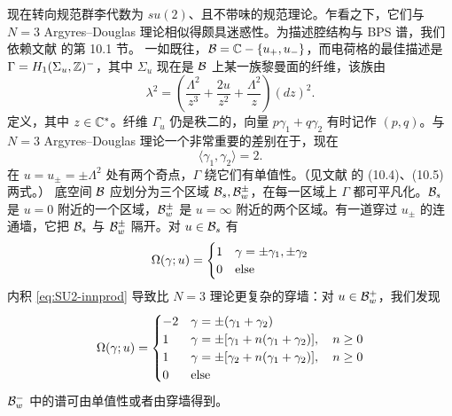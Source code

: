 现在转向规范群李代数为 $su(2)$、且不带味的规范理论。乍看之下，它们与 $N=3$ Argyres--Douglas 理论相似得颇具迷惑性。为描述腔结构与 BPS 谱，我们依赖文献 \cite{Gaiotto:2009hg} 的第 10.1 节。
一如既往，$\mathcal{B}=\mathbb{C}-\{u_+,u_-\}$，而电荷格的最佳描述是
$\Gamma=H_1(\Sigma_u,\mathbb{Z})^-$，其中 $\Sigma_u$ 现在是 $\mathcal{B}$ 上某一族黎曼面的纤维，该族由
%
\begin{equation}
\lambda^2 = \left(\frac{\Lambda^2}{z^3 } + \frac{2u}{z^2} + \frac{\Lambda^2}{z} \right) (dz)^2.
\end{equation}
%
定义，其中 $z\in \mathbb{C}^*$。纤维 $\Gamma_u$ 仍是秩二的，向量 $p\gamma_1 + q\gamma_2$ 有时记作 $(p,q)$。与
$N=3$ Argyres--Douglas 理论一个非常重要的差别在于，现在
%
\begin{equation}\label{eq:SU2-innprod}
\langle \gamma_1, \gamma_2 \rangle = 2.
\end{equation}
%
在 $u=u_\pm = \pm \Lambda^2$ 处有两个奇点，$\Gamma$ 绕它们有单值性。（见文献 \cite{Gaiotto:2009hg} 的 (10.4)、(10.5) 两式。）
底空间 $\mathcal{B}$ 应划分为三个区域 $\mathcal{B}_s, \mathcal{B}_{w}^\pm$，在每一区域上 $\Gamma$ 都可平凡化。$\mathcal{B}_{s}$ 是 $u=0$ 附近的一个区域，$\mathcal{B}_{w}^\pm$ 是 $u=\infty$ 附近的两个区域。有一道穿过
$u_\pm$ 的连通墙，它把 $\mathcal{B}_s$ 与 $\mathcal{B}_{w}^\pm$ 隔开。对 $u \in \mathcal{B}_s$ 有
%
\begin{equation}
\Omega(\gamma;u) = \begin{cases} 1 & \gamma = \pm \gamma_1, \pm \gamma_2 \\
0 & {\rm else} \\ \end{cases}
\end{equation}
%
内积 \eqref{eq:SU2-innprod}
导致比 $N=3$ 理论更复杂的穿墙：对 $u \in \mathcal{B}_w^+$，我们发现
%
\begin{equation}\label{eq:SU2-weak-spec}
\Omega(\gamma;u) = \begin{cases} -2 & \gamma = \pm (\gamma_1 +  \gamma_2) \\
1 & \gamma = \pm [\gamma_1 + n(\gamma_1+\gamma_2) ], \quad n \geq 0 \\
1 & \gamma = \pm [\gamma_2 + n(\gamma_1+\gamma_2) ], \quad n \geq 0 \\
0 & {\rm else} \\ \end{cases}
\end{equation}
%
$\mathcal{B}_w^-$ 中的谱可由单值性或者由穿墙得到。


